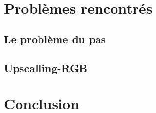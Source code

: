 \documentclass[12pt, a4paper]{article}
\begin{document}
\section{Problèmes rencontrés}
	\subsection{Le problème du pas}
	\subsection{Upscalling-RGB}

\section*{Conclusion}
\end{document}
